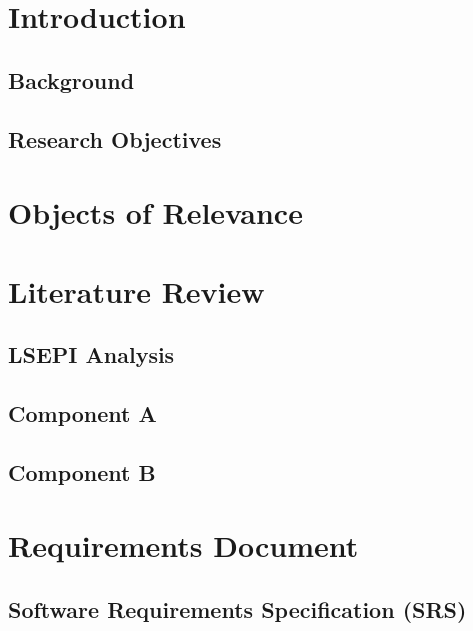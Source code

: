 \documentclass[12pt,a4paper]{report}
\begin{document}

\chapter{Introduction}
\label{chap:introduction}
\section{Background}

\section{Research Objectives}

\chapter{Objects of Relevance}
\label{chap:objects}

\chapter{Literature Review}
\label{chap:litreview}
\section{LSEPI Analysis}

\section{Component A}

\section{Component B}


\chapter{Requirements Document}
\label{chap:requirements}
\section{Software Requirements Specification (SRS)}
\label{sec:srs}
\end{document}
